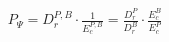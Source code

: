 \documentclass[conference]{IEEEtran}
\begin{document}
\begin{eqnarray}
\label{eq:protocol_performance}
{ P }_{ \Psi }= {{ D }_{ r }^{ P,B }} \cdot \frac { 1 }{ { E }_{c}^{ P,B } } 
= \frac {{ D }_{ r }^{ P }}{{ D }_{ r }^{ B } } \cdot \frac{{ E }_{c}^{ B }}{{ E }_{c}^{ P }}
\end{eqnarray}










\end{document}

